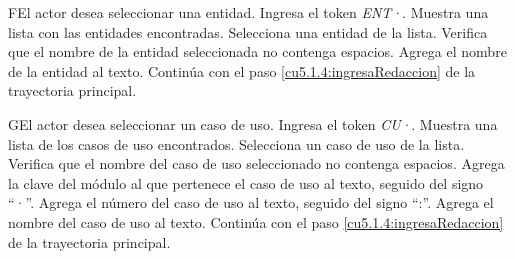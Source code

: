  \begin{UCtrayectoriaA}{F}{El actor desea seleccionar una entidad.}
 	\UCpaso[\UCactor] Ingresa el token {\it ENT·}.	
 	\UCpaso[\UCsist] Muestra una lista con las entidades encontradas.
 	\UCpaso[\UCactor] Selecciona una entidad de la lista.
  	\UCpaso[\UCsist] Verifica que el nombre de la entidad seleccionada no contenga espacios. 
  	\UCpaso[\UCsist] Agrega el nombre de la entidad al texto.
    \UCpaso[] Continúa con el paso \ref{cu5.1.4:ingresaRedaccion} de la trayectoria principal.
 \end{UCtrayectoriaA}
 \begin{UCtrayectoriaA}{G}{El actor desea seleccionar un caso de uso.}
 	\UCpaso[\UCactor] Ingresa el token {\it CU·}.
  	\UCpaso[\UCsist] Muestra una lista de los casos de uso encontrados.
 	\UCpaso[\UCactor] Selecciona un caso de uso de la lista.
  	\UCpaso[\UCsist] Verifica que el nombre del caso de uso seleccionado no contenga espacios. 
  	\UCpaso[\UCsist] Agrega la clave del módulo al que pertenece el caso de uso al texto, seguido del signo ``·''.
  	\UCpaso[\UCsist] Agrega el número del caso de uso al texto, seguido del signo ``:''.
  	\UCpaso[\UCsist] Agrega el nombre del caso de uso al texto.
    \UCpaso[] Continúa con el paso \ref{cu5.1.4:ingresaRedaccion} de la trayectoria principal.
 \end{UCtrayectoriaA}
 

